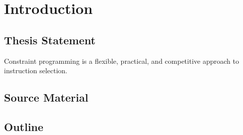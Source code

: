 %

\chapter{Introduction}

\section{Thesis Statement}

\begin{statement}
  Constraint programming is a flexible, practical, and competitive approach to
  instruction selection.
\end{statement}

\section{Source Material}

\section{Outline}
